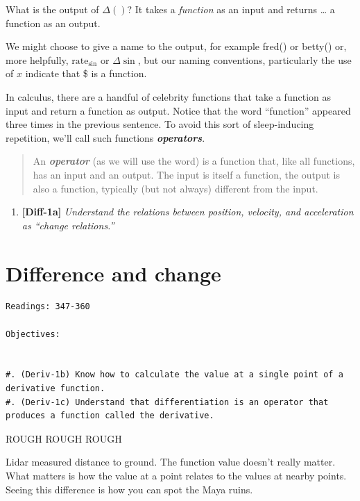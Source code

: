 \documentclass[
]{book}
\providecommand{\tightlist}{%
  \setlength{\itemsep}{0pt}\setlength{\parskip}{0pt}}
\begin{document}
What is the output of \(\Delta()\)? It takes a \emph{function} as an input and returns \ldots{} a function as an output.

We might choose to give a name to the output, for example fred() or betty() or, more helpfully, \(\mbox{rate}_{\sin}\) or \(\Delta \sin\), but our naming conventions, particularly the use of \(x\) indicate that \$ is a function.

In calculus, there are a handful of celebrity functions that take a function as input and return a function as output. Notice that the word ``function'' appeared three times in the previous sentence. To avoid this sort of sleep-inducing repetition, we'll call such functions \textbf{\emph{operators}}.

\begin{quote}
An \textbf{\emph{operator}} (as we will use the word) is a function that, like all functions, has an input and an output. The input is itself a function, the output is also a function, typically (but not always) different from the input.
\end{quote}

\begin{enumerate}
\tightlist
\item
  \textbf{{[}Diff-1a{]}} \emph{Understand the relations between position, velocity, and acceleration as ``change relations.''}
\end{enumerate}

\hypertarget{difference-and-change}{%
\chapter{Difference and change}\label{difference-and-change}}

\begin{verbatim}
Readings: 347-360

Objectives:


#. (Deriv-1b) Know how to calculate the value at a single point of a derivative function.
#. (Deriv-1c) Understand that differentiation is an operator that produces a function called the derivative.
\end{verbatim}

ROUGH ROUGH ROUGH

Lidar measured distance to ground. The function value doesn't really matter. What matters is how the value at a point relates to the values at nearby points. Seeing this difference is how you can spot the Maya ruins.
\end{document}
